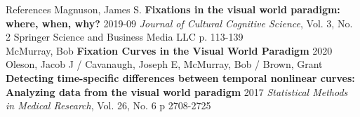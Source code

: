 \documentclass{beamer}
\begin{document}
%
%

\begin{frame}{References}
Magnuson, James S. \textbf{Fixations in the visual world paradigm: where, when, why?} 2019-09 \textit{Journal of Cultural Cognitive Science}, Vol. 3, No. 2 Springer  Science and Business Media LLC p. 113-139 \newline \\

McMurray, Bob \textbf{Fixation Curves in the Visual World Paradigm} 2020 \newline \\

Oleson, Jacob J / Cavanaugh, Joseph E, McMurray, Bob / Brown, Grant \textbf{Detecting time-specific differences between temporal nonlinear curves: Analyzing data from the visual world paradigm} 2017 \textit{Statistical Methods in Medical Research}, Vol. 26, No. 6 p 2708-2725 \newline \\
\end{frame}
\end{document}
